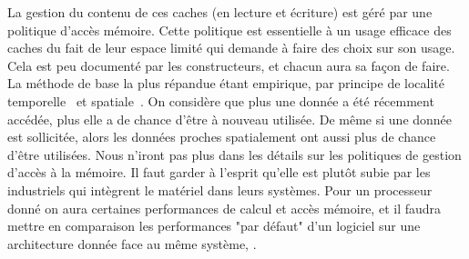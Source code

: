 \documentclass[french, a4paper, 11pt, twoside, pdftex]{StyleThese}
\begin{document}
			La gestion du contenu de ces caches (en lecture et écriture) est géré par une politique d'accès mémoire. Cette politique est essentielle à un usage efficace des caches du fait de leur espace limité qui demande à faire des choix sur son usage. Cela est peu documenté par les constructeurs,  et chacun aura sa façon de faire.
			La méthode de base la plus répandue étant empirique, par principe de localité temporelle~\cite{durrieu2014predictable} et spatiale~\cite{wilkes1965slave}. On considère que plus une donnée a été récemment accédée, plus elle a de chance d'être à nouveau utilisée. De même si une donnée est sollicitée, alors les données proches spatialement ont aussi plus de chance d'être utilisées. 
			Nous n'iront pas plus dans les détails sur les politiques de gestion d'accès à la mémoire. Il faut garder à l'esprit qu'elle est plutôt subie par les industriels qui intègrent le matériel dans leurs systèmes. Pour un processeur donné on aura certaines performances de calcul et accès mémoire, et il faudra mettre en comparaison les performances "par défaut" d'un logiciel sur une architecture donnée face au même système, .

			
			
\end{document}
